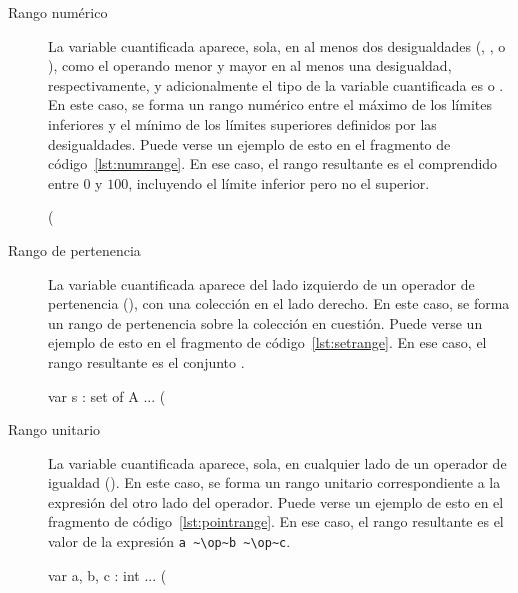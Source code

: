 \begin{description}%

  \item [Rango numérico] La variable cuantificada aparece, sola, en al menos dos
  desigualdades (\ingra{<}, \ingra{<=}, \ingra{>} o \ingra{>=}), como el
  operando menor y mayor en al menos una desigualdad, respectivamente, y
  adicionalmente el tipo de la variable cuantificada es  o .
  En este caso, se forma un rango numérico entre el máximo de los límites
  inferiores y el mínimo de los límites superiores definidos por las
  desigualdades. Puede verse un ejemplo de esto en el fragmento de código~\ref{lst:numrange}. En ese caso, el rango resultante es el comprendido entre $0$ y $100$,
  incluyendo  el límite inferior pero no el superior.

\begin{gracielacode}[caption=Cuantificación con rango numérico, label=lst:numrange]
(%
\end{gracielacode}

  \item [Rango de pertenencia] La variable cuantificada aparece del lado izquierdo
  de un operador de pertenencia (\ingra{~\Elem~}), con una colección en el lado derecho.
  En este caso, se forma un rango de pertenencia sobre la colección en
  cuestión. Puede verse un ejemplo de esto en el fragmento de código~\ref{lst:setrange}.  En ese caso, el rango resultante es el conjunto .

\begin{gracielacode}[caption=Cuantificación con rango de pertenencia, label=lst:setrange]
var s : set of A
...
(%
\end{gracielacode}

  \item [Rango unitario] La variable cuantificada aparece, sola, en cualquier lado de
  un operador de igualdad (\ingra{==}). En este caso, se forma un rango unitario
  correspondiente a la expresión del otro lado del operador. Puede verse un
  ejemplo de esto en el fragmento de código~\ref{lst:pointrange}. En ese caso,
  el rango resultante es el valor de la expresión
  \lstinline[language=graciela]{a ~\op~b ~\op~c}.

\begin{gracielacode}[caption=Cuantificación con rango unitario, label=lst:pointrange]
var a, b, c : int
...
(%
\end{gracielacode}


\end{description}
